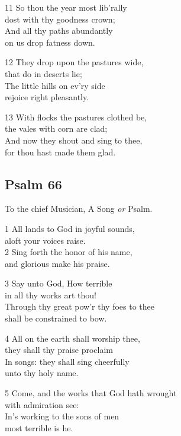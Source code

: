 11 So thou the year most lib’rally\\
dost with thy goodness crown;\\
And all thy paths abundantly\\
on us drop fatness down.

12 They drop upon the pastures wide,\\
that do in deserts lie;\\
The little hills on ev’ry side\\
rejoice right pleasantly.

13 With flocks the pastures clothed be,\\
the vales with corn are clad;\\
And now they shout and sing to thee,\\
for thou hast made them glad.

\begin{center}
\quad{}\quad{}
\end{center}

\subsection*{Psalm 66}

To the chief Musician,
A Song \emph{or} Psalm.

1 All lands to God in joyful sounds,\\
aloft your voices raise.\\
2 Sing forth the honor of his name,\\
and glorious make his praise.

3 Say unto God, How terrible\\
in all thy works art thou!\\
Through thy great pow’r thy foes to thee\\
shall be constrained to bow.

4 All on the earth shall worship thee,\\
they shall thy praise proclaim\\
In songs: they shall sing cheerfully\\
unto thy holy name.

5 Come, and the works that God hath wrought\\
with admiration see:\\
In’s working to the sons of men\\
most terrible is he.

